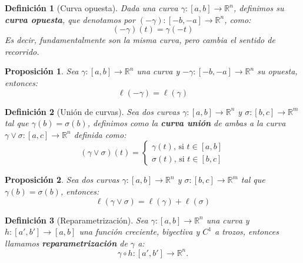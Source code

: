 \documentclass[10pt,a4paper,openright]{book}
\theoremstyle{break}
\newtheorem*{defi}{Definición}
\newtheorem*{prop}{Proposición}
\begin{document}
\begin{defi}[Curva opuesta]
Dada una curva $\gamma:[a,b]\rightarrow \mathbb{R}^n$, definimos su \textbf{curva opuesta}, que denotamos por $(-\gamma):[-b,-a]\rightarrow \mathbb{R}^n$, como: 
$$\left( -\gamma \right) \left( t \right) = \gamma \left( -t \right) $$
Es decir, fundamentalmente son la misma curva, pero cambia el sentido de recorrido.
\end{defi}

\begin{prop}
Sea $\gamma:[a,b]\rightarrow \mathbb{R}^n$ una curva y $-\gamma:[-b,-a]\rightarrow \mathbb{R}^n$ su opuesta, entonces: 
$$\ell \left( -\gamma \right) = \ell \left( \gamma \right) $$
\end{prop}

\begin{defi}[Unión de curvas]
Sea dos curvas $\gamma : \left[ a, b \right] \rightarrow \mathbb{R}^n$ y $\sigma : \left[ b, c \right] \rightarrow \mathbb{R}^m$ tal que $\gamma\left( b \right) = \sigma \left( b \right)$, definimos como la \textbf{curva unión} de ambas a la curva $\gamma \lor \sigma: \left[ a, c \right] \rightarrow \mathbb{R}^n$ definida como:
$$\left( \gamma \lor \sigma \right) \left( t \right) = \begin{cases}
    \gamma\left( t \right) \text{, si } t \in \left[ a, b \right]\\
    \sigma\left( t \right) \text{, si } t \in \left[ b, c \right] 
\end{cases}$$
\end{defi}
\begin{prop}
Sea dos curvas $\gamma : \left[ a, b \right] \rightarrow \mathbb{R}^n$ y $\sigma : \left[ b, c \right] \rightarrow \mathbb{R}^m$ tal que $\gamma\left( b \right) = \sigma \left( b \right)$, entonces:
$$\ell \left( \gamma \lor \sigma \right) = \ell \left( \gamma \right) + \ell\left( \sigma \right) $$
\end{prop}

\begin{defi}[Reparametrización]
Sea $\gamma: \left[ a, b \right] \rightarrow \mathbb{R}^n$ una curva y $h: \left[ a', b' \right] \rightarrow \left[ a, b \right]$ una función creciente, biyectiva y $C^1$ a trozos, entonces llamamos \textbf{reparametrización} de $\gamma$ a:
$$\gamma \circ h: \left[ a', b' \right] \rightarrow \mathbb{R}^n.$$
\end{defi}
\end{document}
